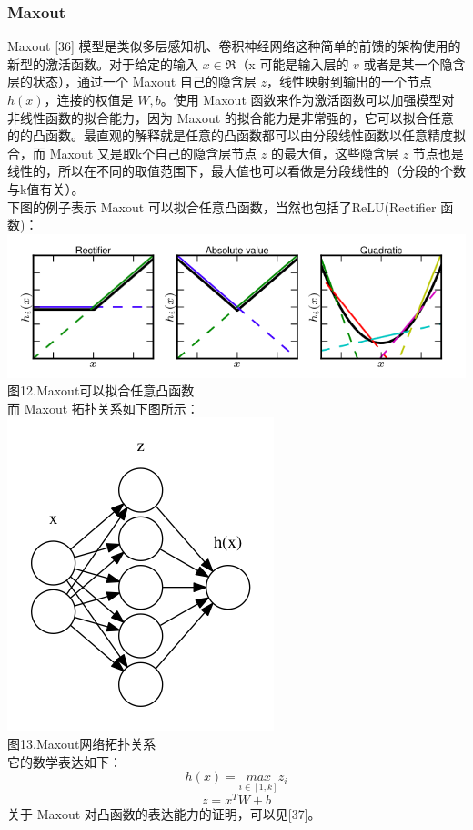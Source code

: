 \subsubsection{Maxout}\label{maxout}

Maxout {[}36{]}
模型是类似多层感知机、卷积神经网络这种简单的前馈的架构使用的新型的激活函数。对于给定的输入
\(x ∈ \Re\)（x 可能是输入层的 \(v\) 或者是某一个隐含层的状态），通过一个
Maxout 自己的隐含层 \(z\)，线性映射到输出的一个节点
\(h(x)\)，连接的权值是 \(W,b\)。使用 Maxout
函数来作为激活函数可以加强模型对非线性函数的拟合能力，因为 Maxout
的拟合能力是非常强的，它可以拟合任意的的凸函数。最直观的解释就是任意的凸函数都可以由分段线性函数以任意精度拟合，而
Maxout 又是取k个自己的隐含层节点 \(z\) 的最大值，这些隐含层 \(z\)
节点也是线性的，所以在不同的取值范围下，最大值也可以看做是分段线性的（分段的个数与k值有关）。\\下图的例子表示
Maxout 可以拟合任意凸函数，当然也包括了ReLU(Rectifier
函数)：\\\includegraphics{picture/maxout.png}\\图12.Maxout可以拟合任意凸函数\\而
Maxout
拓扑关系如下图所示：\\\includegraphics{picture/maxout-implement.png}\\图13.Maxout网络拓扑关系\\它的数学表达如下：\\\[h(x) = {max}\limits_{i∈[1,k]}z_{i}\]
\[z = x^TW + b\] 关于 Maxout 对凸函数的表达能力的证明，可以见{[}37{]}。

